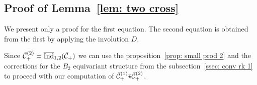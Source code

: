 \subsection{Proof of Lemma~\ref{lem: two cross}}
We present only a proof for the first equation. The second equation is obtained from the first by applying the involution $D$.

Since $\bar{\mathcal{C}}_+^{(2)}=\overline{\mathrm{Ind}}_{1,2}(\bar{\mathcal{C}}_+)$ we can use the proposition~\ref{prop: small prod 2} and the corrections for the $B_2$ equivariant structure from
the subsection~\ref{ssec: conv rk 1} to proceed with our computation of  $\bar{\mathcal{C}}_+^{(1)}\bar{\star}\bar{\mathcal{C}}_+^{(2)}$.

